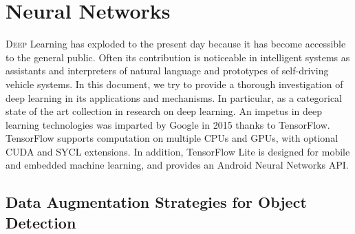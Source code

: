 \chapter{Neural Networks}
\label{chap:neuralnetworks}
%
\lettrine[lines=3]{D}{eep} Learning has exploded to the present day because it
has become accessible to the general public. Often its contribution is
noticeable in intelligent systems as assistants and interpreters of natural
language and prototypes of self-driving vehicle systems. In this document, we
try to provide a thorough investigation of deep learning in its applications and
mechanisms. In particular, as a categorical state of the art collection in
research on deep learning. An impetus in deep learning technologies was imparted
by Google in 2015 thanks to TensorFlow. TensorFlow supports computation on
multiple CPUs and GPUs, with optional CUDA and SYCL extensions. In addition,
TensorFlow Lite is designed for mobile and embedded machine learning, and
provides an Android Neural Networks API.\cite{article}
% 
% 






\section{Data Augmentation Strategies for Object Detection}
\label{sec:nn-augmentation-strategies}
